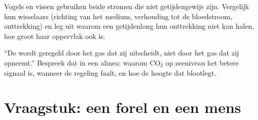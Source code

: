\begin{exercise}[$\star\star\star$]\label{exo:b1:gas-exchange:11}
Vogels en vissen gebruiken beide stromen die niet getijdengewijs zijn. Vergelijk
hun wisselaars (richting van het medium, verhouding tot de bloedstroom,
onttrekking) en leg uit waarom een getijdenlong hun onttrekking niet kan halen, hoe
groot haar oppervlak ook is.
\end{exercise}

\begin{exercise}[$\star\star\star$]\label{exo:b1:gas-exchange:12}
``De  wordt geregeld door het gas dat zij uitscheidt, niet door het gas dat zij
opneemt.'' Bespreek dat in een alinea: waarom $\mathrm{CO_2}$ op zeeniveau het
betere signaal is, wanneer de regeling faalt, en hoe de hoogte dat blootlegt.
\end{exercise}

\section{Vraagstuk: een forel en een mens}


